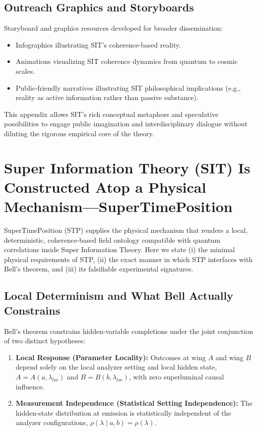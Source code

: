 \documentclass[american,11pt,letterpaper]{article}
\def\mathrm#1{#1}%
\begin{document}
\subsection{Outreach Graphics and Storyboards}

Storyboard and graphics resources developed for broader dissemination:

\begin{itemize}
    \item Infographics illustrating SIT's coherence-based reality.
    \item Animations visualizing SIT coherence dynamics from quantum to cosmic scales.
    \item Public-friendly narratives illustrating SIT philosophical implications (e.g., reality as active information rather than passive substance).
\end{itemize}

This appendix allows SIT's rich conceptual metaphors and speculative possibilities to engage public imagination and interdisciplinary dialogue without diluting the rigorous empirical core of the theory.



\section{Super Information Theory (SIT) Is Constructed Atop a Physical Mechanism---SuperTimePosition}
\label{app:stp-bell-mechanism}

SuperTimePosition (STP) supplies the physical mechanism that renders a local, deterministic, coherence-based field ontology compatible with quantum correlations inside Super Information Theory. Here we state (i) the minimal physical requirements of STP, (ii) the exact manner in which STP interfaces with Bell's theorem, and (iii) its falsifiable experimental signatures.

\subsection{Local Determinism and What Bell Actually Constrains}

Bell's theorem constrains hidden-variable completions under the joint conjunction of two distinct hypotheses:
\begin{enumerate}[leftmargin=2em]
  \item \textbf{Local Response (Parameter Locality):} Outcomes at wing $A$ and wing $B$ depend solely on the local analyzer setting and local hidden state, $A = A(a, \lambda_{\mathrm{loc}})$ and $B = B(b, \lambda_{\mathrm{loc}})$, with zero superluminal causal influence.
  \item \textbf{Measurement Independence (Statistical Setting Independence):} The hidden-state distribution at emission is statistically independent of the analyzer configurations, $\rho(\lambda \mid a, b) = \rho(\lambda)$.
\end{enumerate}
\end{document}
